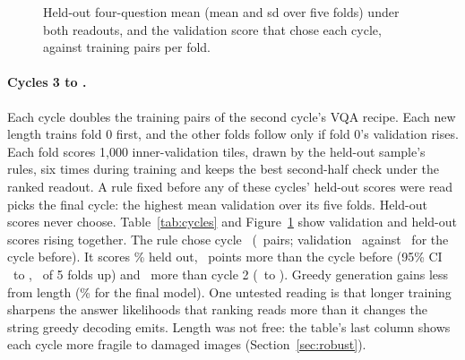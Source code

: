 \documentclass[10pt,twocolumn]{article}
\begin{document}
\begin{table}[t]\centering\small
\resizebox{\textwidth}{!}{}
\caption{Training length, five field-grouped folds per cycle (\%). Validation is the selection score: each fold's best second-half check, averaged over folds (cycle 2 validated on a different draw). Held out: mean $\pm$ sd over folds of the four-question mean. Change: against the cycle before, with a paired $t$ interval over folds and the number of folds that improved. Captions use cycle 2's adapters in these rows. Perturbed images: the change in greedy accuracy on fold 0's 500 robustness tiles, averaged over the seventeen image perturbations of Figure~\ref{fig:robust}.}\label{tab:cycles}
\end{table}
\begin{figure}[t]\centering
{}
\caption{Held-out four-question mean (mean and sd over five folds) under both readouts, and the validation score that chose each cycle, against training pairs per fold.}\label{fig:length}
\end{figure}
\paragraph{Cycles 3 to \finalCycle.} Each cycle doubles the training pairs of the second cycle's VQA recipe. Each new length trains fold 0 first, and the other folds follow only if fold 0's validation rises. Each fold scores 1,000 inner-validation tiles, drawn by the held-out sample's rules, six times during training and keeps the best second-half check under the ranked readout. A rule fixed before any of these cycles' held-out scores were read picks the final cycle: the highest mean validation over its five folds. Held-out scores never choose. Table~\ref{tab:cycles} and Figure~\ref{fig:length} show validation and held-out scores rising together. The rule chose cycle \finalCycle\ (\finalPairs\ pairs; validation \finalVal\ against \prevVal\ for the cycle before). It scores \blipMean\% held out, \finalChange\ points more than the cycle before (95\% CI \finalChangeLo\ to \finalChangeHi, \finalChangeFolds\ of 5 folds up) and \totalChange\ more than cycle 2 (\totalChangeLo\ to \totalChangeHi). Greedy generation gains less from length (\blipGreedy\% for the final model). One untested reading is that longer training sharpens the answer likelihoods that ranking reads more than it changes the string greedy decoding emits. Length was not free: the table's last column shows each cycle more fragile to damaged images (Section~\ref{sec:robust}).
\end{document}
